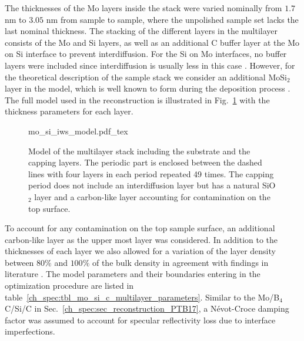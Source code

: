 The thicknesses of the Mo layers inside the stack were varied nominally from $1.7$ nm to $3.05$ nm from sample to sample, where the unpolished sample set lacks the last nominal thickness. The stacking of the different layers in the multilayer consists of the Mo and Si layers, as well as an additional C buffer layer at the Mo on Si interface to prevent interdiffusion. For the Si on Mo interfaces, no buffer layers were included since interdiffusion is usually less in this case \cite{petford-long_highresolution_1987}. However, for the theoretical description of the sample stack we consider an additional MoSi$_2$ layer in the model, which is well known to form during the deposition process \cite{bajt_investigation_2001}. The full model used in the reconstruction is illustrated in Fig.~\ref{ch_spec:fig_model_unpolished_and_polished_samples} with the thickness parameters for each layer.
\begin{figure}[htbp]
    \def\svgwidth{0.7\textwidth}
    \selectfont\footnotesize
    {mo_si_iws_model.pdf_tex}
    \caption[Model of the Mo/Si/C multilayer stack including the substrate and the capping layers.]{Model of the multilayer stack including the substrate and the capping layers. The periodic part is enclosed between the dashed lines with four layers in each period repeated 49 times. The capping period does not include an interdiffusion layer but has a natural SiO$_2$ layer and a carbon-like layer accounting for contamination on the top surface.}
    \label{ch_spec:fig_model_unpolished_and_polished_samples}
\end{figure}
To account for any contamination on the top sample surface, an additional carbon-like layer as the upper most layer was considered. In addition to the thicknesses of each layer we also allowed for a variation of the layer density between $80\%$ and $100\%$ of the bulk density in agreement with findings in literature \cite{braun_mo/si_2002}. The model parameters and their boundaries entering in the optimization procedure are listed in table~\ref{ch_spec:tbl_mo_si_c_multilayer_parameters}. Similar to the Mo/B$_4$C/Si/C in Sec.~\ref{ch_spec:sec_reconstruction_PTB17}, a N\'{e}vot-Croce damping factor was assumed to account for specular reflectivity loss due to interface imperfections. 
